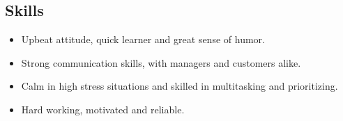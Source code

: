 \documentclass[oneside, final]{scrartcl}
\begin{document}
\begin{center}
\section{Skills}
\begin{itemize}
	\setlength{\itemsep}{1pt}
	\setlength{\parskip}{0pt}
	\setlength{\parsep}{0pt}
	\setlength{\leftmargin}{-5mm}
    \item Upbeat attitude, quick learner and great sense of humor.
    \item Strong communication skills, with managers and customers alike.
    \item Calm in high stress situations and skilled in multitasking and prioritizing.
    \item Hard working, motivated and reliable.
\end{itemize}

\end{center}
\end{document}
